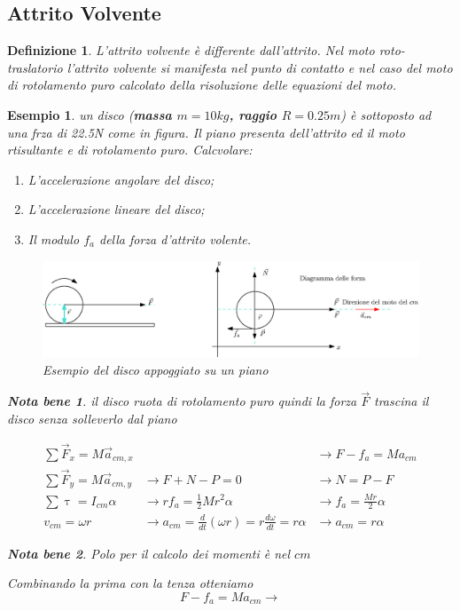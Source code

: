 \documentclass{book}
\newtheorem{notab}{Nota bene}
\newtheorem{defi}{Definizione}
\newtheorem{esempio}{Esempio}
\begin{document}
\subsection{Attrito Volvente}
\begin{defi}
  L'attrito volvente è differente dall'attrito. Nel moto roto-traslatorio l'attrito
  volvente si manifesta nel punto di contatto e nel caso del moto di rotolamento puro
  calcolato della risoluzione delle equazioni del moto.
\end{defi}
\begin{esempio}
  un disco ({\bf massa $m=10kg$, raggio $R=0.25m$}) è sottoposto ad una frza di 22.5N
  come in figura. Il piano presenta dell'attrito ed il moto rtisultante e di rotolamento
  puro. Calcvolare:
  \begin{enumerate}
  \item L'accelerazione angolare del disco;
  \item L'accelerazione lineare del disco;
  \item Il modulo $f_a$ della forza d'attrito volente.
  \end{enumerate}
  \begin{figure}[ht]
    \centering
    \includegraphics[width=12cm]{img/finiti/attrito-volvente.eps}
    \caption{Esempio del disco appoggiato su un piano}
    \label{fig:roto-traslario-es}
  \end{figure}
  \begin{notab}
    il disco ruota di rotolamento puro quindi la forza $\vec{F}$ trascina il disco senza
    solleverlo dal piano 
  \end{notab}
  \begin{eqnarray*}
    \displaystyle\sum \vec{F}_x=M\vec{a}_{cm,x} && \to\boxed{F-f_a=Ma_{cm}}\\
    \displaystyle\sum \vec{F}_y=M\vec{a}_{cm,y} &\to F+N-P=0& \to \boxed{N=P-F}\\
    \displaystyle\sum \uptau = I_{cm}\alpha& \to rf_a=\frac{1}{2}Mr^2\alpha
                                                &\to \boxed{f_a=\frac{Mr}{2}\alpha}\\
    v_{cm}=\omega r&\to a_{cm}=\frac{d}{dt}(\omega r)=r\frac{d\omega}{dt}=r\alpha
                                                &\to \boxed{a_{cm}=r\alpha}
  \end{eqnarray*}
  \begin{notab}
    Polo per il calcolo dei momenti è nel $cm$
  \end{notab}
  Combinando la prima con la tenza otteniamo
  \begin{equation*}
    F-f_a=Ma_{cm}\to 
  \end{equation*}
\end{esempio}



\end{document}
